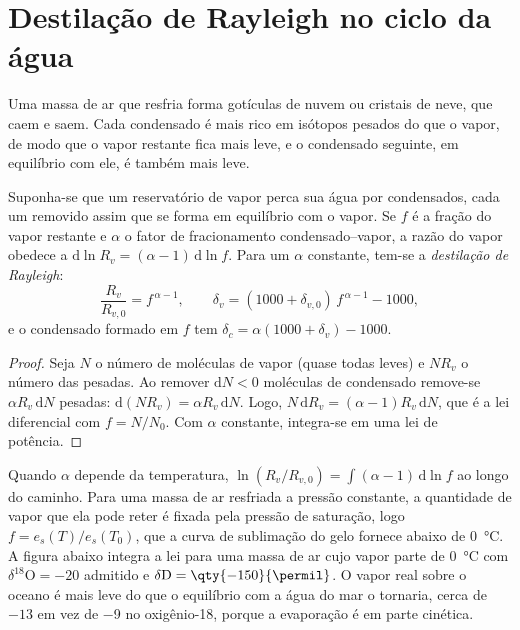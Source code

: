 \section{Destilação de Rayleigh no ciclo da água}\label{sec:b3:stable-isotopes:rayleigh}

Uma massa de ar que resfria forma gotículas de nuvem ou cristais de neve, que caem e
saem. Cada condensado é mais rico em isótopos pesados do que o vapor, de modo que o
vapor restante fica mais leve, e o condensado seguinte, em equilíbrio com ele, é
também mais leve.

\begin{proposition}\label{prop:b3:stable-isotopes:rayleigh-distillation}
Suponha-se que um reservatório de vapor perca sua água por condensados, cada um removido assim que
se forma em equilíbrio com o vapor. Se $f$ é a fração do
vapor restante e $\alpha$ o fator de fracionamento condensado--vapor, a
razão do vapor obedece a $\mathrm d\ln R_v = (\alpha - 1)\,\mathrm d\ln f$. Para
um $\alpha$ constante, tem-se a \emph{destilação de
Rayleigh}:
\[
\frac{R_v}{R_{v,0}} = f^{\,\alpha - 1}, \qquad
\delta_v = (1000 + \delta_{v,0})\,f^{\,\alpha - 1} - 1000,
\]
e o condensado formado em $f$ tem $\delta_c = \alpha(1000 + \delta_v) - 1000$.
\end{proposition}

\begin{proof}
Seja $N$ o número de moléculas de vapor (quase todas leves) e $N R_v$
o número das pesadas. Ao remover $\mathrm dN < 0$ moléculas de condensado
remove-se $\alpha R_v\,\mathrm dN$ pesadas: $\mathrm d(NR_v) = \alpha
R_v\,\mathrm dN$. Logo, $N\,\mathrm dR_v = (\alpha - 1)R_v\,\mathrm dN$, que é a
lei diferencial com $f = N/N_0$. Com $\alpha$ constante, integra-se em
uma lei de potência.
\end{proof}

Quando $\alpha$ depende da temperatura, $\ln(R_v/R_{v,0}) = \int(\alpha - 1)\,
\mathrm d\ln f$ ao longo do caminho. Para uma massa de ar resfriada a pressão constante,
a quantidade de vapor que ela pode reter é fixada pela pressão de saturação, logo $f =
e_s(T)/e_s(T_0)$, que a curva de sublimação do gelo fornece abaixo de
\qty{0}{\celsius}. A figura abaixo integra a lei para uma massa de ar cujo
vapor parte de \qty{0}{\celsius} com $\delta^{18}\mathrm O = -20$ admitido
e $\delta\mathrm D = \qty{-150}{\permil}$. O vapor real sobre o oceano é
mais leve do que o equilíbrio com a água do mar o tornaria, cerca de $-13$ em vez de
\qty{-9}{\permil} no oxigênio-18, porque a evaporação é em parte cinética.

